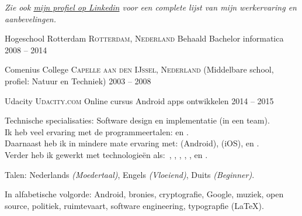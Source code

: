 \documentclass[10pt,a4paper]{article}
\begin{document}
\begin{center}
  \emph{Zie ook \href{http://www.linkedin.com/in/frankkie12345}{mijn profiel op Linkedin} voor een complete lijst van mijn werkervaring en aanbevelingen.}
\end{center}


\spacedhrule{-0.2em}{-0.4em}


\headedsection
  {Hogeschool Rotterdam}
  {\textsc{Rotterdam, Nederland}} {%
  \headedsubsection
    {Behaald Bachelor informatica}
    {2008 -- 2014}
    {}
}

\headedsection
  {Comenius College}
  {\textsc{Capelle aan den IJssel, Nederland}} {%
  \headedsubsection
    { \textnormal{(Middelbare school, profiel: Natuur en Techniek)}}
    {2003 -- 2008} {}
}

\headedsection
  {Udacity}
  {\textsc{Udacity.com}} {
  \headedsection
  { \textnormal{Online cursus Android apps ontwikkelen}}
  {2014 -- 2015} 
  {}
  }

\spacedhrule{0.5em}{-0.4em}


\inlineheadsection  %
  {Technische specialisaties:}
  {Software design en implementatie (in een team). \\
  Ik heb veel ervaring met de programmeertalen:  en . \\
  Daarnaast heb ik in mindere mate ervaring met:  (Android),  (iOS),  en . \\
  Verder heb ik gewerkt met technologie\"en als:\ , , , , ,  en .}

\inlineheadsection
  {Talen:}
  {Nederlands \emph{(Moedertaal)}, Engels \emph{(Vloeiend)}, Duits \emph{(Beginner)}.}


\spacedhrule{1.6em}{-0.4em}


\inlineheadsection
  {In alfabetische volgorde:}
  {Android, bronies, cryptografie, Google, muziek, open source, politiek, ruimtevaart, software engineering, typograpfie (\LaTeX).}
\end{document}
